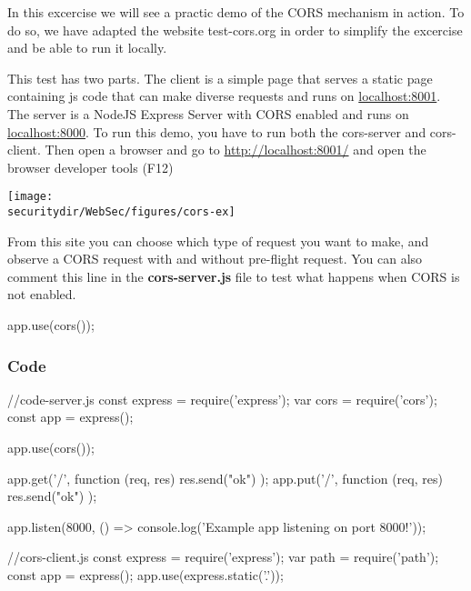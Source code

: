 \begin{Exercise}[label={websec-cors-practs}]
	In this excercise we will see a practic demo of the CORS mechanism in action. To do so, we have adapted the website test-cors.org in order to simplify the excercise and be able to run it locally. 
	
	This test has two parts. The client is a simple page that serves a static page containing js code that can make diverse requests and runs on \url{localhost:8001}. The server is a NodeJS Express Server with CORS enabled and runs on \url{localhost:8000}. To run this demo, you have to run both the cors-server and cors-client. Then open a browser and go to \url{http://localhost:8001/} and open the browser developer tools (F12)
	
\vspace{0.2cm}
    \begin{centering}
      \texttt{[image: \\securitydir/WebSec/figures/cors-ex]}
      \par\end{centering}
  
	From this site you can choose which type of request you want to make, and observe a CORS request with and without pre-flight request. 
	You can also comment this line in the \textbf{cors-server.js} file to test what happens when CORS is not enabled.
	\begin{js}app.use(cors());\end{js}
  
  \subsubsection{Code}
  \begin{js}
//code-server.js
const express = require('express');
var cors = require('cors');
const app = express();

app.use(cors());

app.get('/', function (req, res) {
  res.send("ok")
});
app.put('/', function (req, res) {
  res.send("ok")
});

app.listen(8000, () => console.log('Example app listening on port 8000!'));
\end{js}

\begin{js}
 //cors-client.js
const express = require('express');
var path = require('path');
const app = express();
app.use(express.static('.'));


\end{js}
\end{Exercise}
